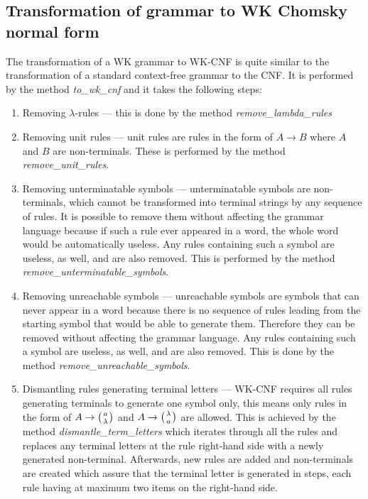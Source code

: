 \subsection{Transformation of grammar to WK Chomsky normal form}
The transformation of a WK grammar to WK-CNF is quite similar to the transformation of a standard context-free grammar to the CNF. It is performed by the method \textit{to\_wk\_cnf} and it takes the following steps:

\begin{enumerate}
  \item{Removing $\lambda$-rules --- this is done by the method \textit{remove\_lambda\_rules}}

  \item{Removing unit rules --- unit rules are rules in the form of $A \rightarrow B$ where $A$ and $B$ are non-terminals. These is performed by the method \textit{remove\_unit\_rules}.}

  \item{Removing unterminatable symbols --- unterminatable symbols are non-terminals, which cannot be transformed into terminal strings by any sequence of rules. It is possible to remove them without affecting the grammar language because if such a rule ever appeared in a word, the whole word would be automatically useless. Any rules containing such a symbol are useless, as well, and are also removed. This is performed by the method \textit{remove\_unterminatable\_symbols}.}

  \item{Removing unreachable symbols --- unreachable symbols are symbols that can never appear in a word because there is no sequence of rules leading from the starting symbol that would be able to generate them. Therefore they can be removed without affecting the grammar language. Any rules containing such a symbol are useless, as well, and are also removed. This is done by the method \textit{remove\_unreachable\_symbols}.}

  \item{Dismantling rules generating terminal letters --- WK-CNF requires all rules generating terminals to generate one symbol only, this means only rules in the form of $A \rightarrow \wkpair{a}{\lambda}$ and $A \rightarrow \wkpair{\lambda}{a}$ are allowed. This is achieved by the method \textit{dismantle\_term\_letters} which iterates through all the rules and replaces any terminal letters at the rule right-hand side with a newly generated non-terminal. Afterwards, new rules are added and non-terminals are created which assure that the terminal letter is generated in steps, each rule having at maximum two items on the right-hand side.

}
\end{enumerate}
